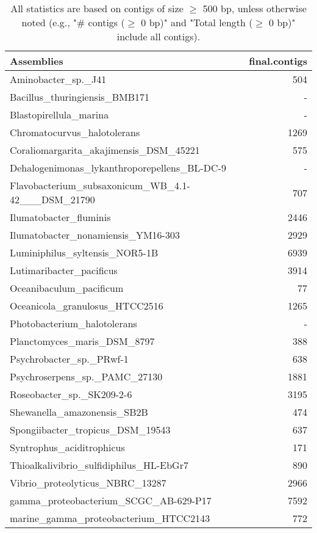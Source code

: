 \documentclass[12pt,a4paper]{article}
\begin{document}
\begin{table}[ht]
\begin{center}
\caption{All statistics are based on contigs of size $\geq$ 500 bp, unless otherwise noted (e.g., "\# contigs ($\geq$ 0 bp)" and "Total length ($\geq$ 0 bp)" include all contigs).}
\begin{tabular}{|l*{1}{|r}|}
\hline
Assemblies & final.contigs \\ \hline
Aminobacter\_sp.\_J41 & 504 \\ \hline
Bacillus\_thuringiensis\_BMB171 & - \\ \hline
Blastopirellula\_marina & - \\ \hline
Chromatocurvus\_halotolerans & 1269 \\ \hline
Coraliomargarita\_akajimensis\_DSM\_45221 & 575 \\ \hline
Dehalogenimonas\_lykanthroporepellens\_BL-DC-9 & - \\ \hline
Flavobacterium\_subsaxonicum\_WB\_4.1-42\_\_\_DSM\_21790 & 707 \\ \hline
Ilumatobacter\_fluminis & 2446 \\ \hline
Ilumatobacter\_nonamiensis\_YM16-303 & 2929 \\ \hline
Luminiphilus\_syltensis\_NOR5-1B & 6939 \\ \hline
Lutimaribacter\_pacificus & 3914 \\ \hline
Oceanibaculum\_pacificum & 77 \\ \hline
Oceanicola\_granulosus\_HTCC2516 & 1265 \\ \hline
Photobacterium\_halotolerans & - \\ \hline
Planctomyces\_maris\_DSM\_8797 & 388 \\ \hline
Psychrobacter\_sp.\_PRwf-1 & 638 \\ \hline
Psychroserpens\_sp.\_PAMC\_27130 & 1881 \\ \hline
Roseobacter\_sp.\_SK209-2-6 & 3195 \\ \hline
Shewanella\_amazonensis\_SB2B & 474 \\ \hline
Spongiibacter\_tropicus\_DSM\_19543 & 637 \\ \hline
Syntrophus\_aciditrophicus & 171 \\ \hline
Thioalkalivibrio\_sulfidiphilus\_HL-EbGr7 & 890 \\ \hline
Vibrio\_proteolyticus\_NBRC\_13287 & 2966 \\ \hline
gamma\_proteobacterium\_SCGC\_AB-629-P17 & 7592 \\ \hline
marine\_gamma\_proteobacterium\_HTCC2143 & 772 \\ \hline
\end{tabular}
\end{center}
\end{table}
\end{document}
